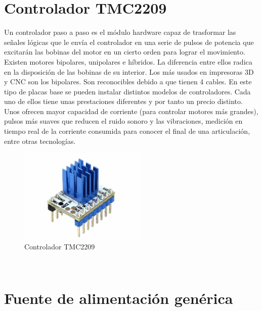 \section{Controlador TMC2209}
\label{subsec:controladorPAP}
Un controlador paso a paso es el módulo hardware capaz de trasformar las señales lógicas que le envía el controlador en una serie de pulsos de
potencia que excitarán las bobinas del motor en un cierto orden para lograr el movimiento. 
Existen motores bipolares, unipolares e híbridos. La diferencia entre ellos radica en la disposición de las bobinas de su interior. Los más usados 
en impresoras 3D y CNC son los bipolares. Son reconocibles debido a que tienen 4 cables.
En este tipo de placas base se pueden instalar distintos modelos de controladores. Cada uno de ellos tiene unas prestaciones diferentes y por tanto 
un precio distinto. Unos ofrecen mayor capacidad de corriente (para controlar motores más grandes), pulsos más suaves que reducen el 
ruido sonoro y las vibraciones, medición en tiempo real de la corriente consumida para conocer el final de una articulación, entre otras tecnologías.  
\begin{figure} [h!]
    \begin{center}
      \includegraphics[width=6cm]{figs/TMC2209.jpg}
    \end{center}
    \caption{Controlador TMC2209}
    \label{fig:robSoldering}
  \end{figure}\ 

\section{Fuente de alimentación genérica}
\label{subsec:fuente_alimentacion}